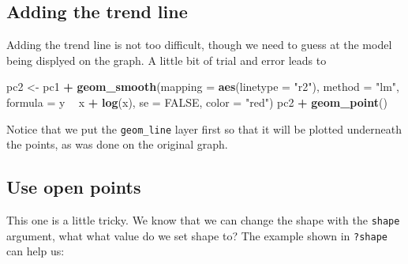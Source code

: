 \documentclass[]{book}
\newenvironment{Shaded}{\begin{snugshade}}{\end{snugshade}}
\newcommand{\KeywordTok}[1]{\textcolor[rgb]{0.13,0.29,0.53}{\textbf{#1}}}
\newcommand{\DataTypeTok}[1]{\textcolor[rgb]{0.13,0.29,0.53}{#1}}
\newcommand{\StringTok}[1]{\textcolor[rgb]{0.31,0.60,0.02}{#1}}
\newcommand{\OtherTok}[1]{\textcolor[rgb]{0.56,0.35,0.01}{#1}}
\newcommand{\OperatorTok}[1]{\textcolor[rgb]{0.81,0.36,0.00}{\textbf{#1}}}
\newcommand{\NormalTok}[1]{#1}
\begin{document}
\subsection{Adding the trend line}\label{adding-the-trend-line}

Adding the trend line is not too difficult, though we need to guess at
the model being displyed on the graph. A little bit of trial and error
leads to

\begin{Shaded}
\begin{Highlighting}[]
\NormalTok{pc2 <-}\StringTok{ }\NormalTok{pc1 }\OperatorTok{+}
\StringTok{  }\KeywordTok{geom_smooth}\NormalTok{(}\DataTypeTok{mapping =} \KeywordTok{aes}\NormalTok{(}\DataTypeTok{linetype =} \StringTok{"r2"}\NormalTok{),}
              \DataTypeTok{method =} \StringTok{"lm"}\NormalTok{,}
              \DataTypeTok{formula =}\NormalTok{ y }\OperatorTok{~}\StringTok{ }\NormalTok{x }\OperatorTok{+}\StringTok{ }\KeywordTok{log}\NormalTok{(x), }\DataTypeTok{se =} \OtherTok{FALSE}\NormalTok{,}
              \DataTypeTok{color =} \StringTok{"red"}\NormalTok{)}
\NormalTok{pc2 }\OperatorTok{+}\StringTok{ }\KeywordTok{geom_point}\NormalTok{()}
\end{Highlighting}
\end{Shaded}

Notice that we put the \texttt{geom\_line} layer first so that it will
be plotted underneath the points, as was done on the original graph.

\subsection{Use open points}\label{use-open-points}

This one is a little tricky. We know that we can change the shape with
the \texttt{shape} argument, what what value do we set shape to? The
example shown in \texttt{?shape} can help us:
\end{document}
